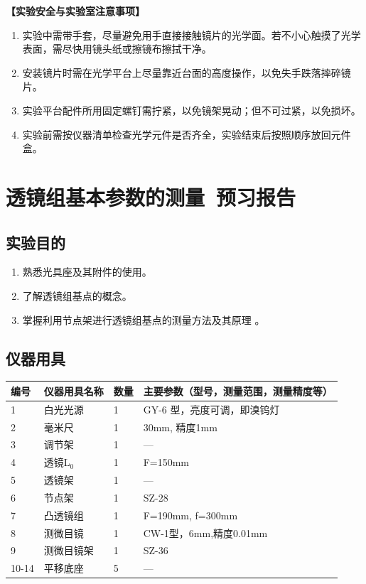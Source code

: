 \documentclass[dvipsnames, svgnames,a4paper,11pt]{article}
\begin{document}
\textbf{【实验安全与实验室注意事项】}\\
\begin{enumerate}
    \item 实验中需带手套，尽量避免用手直接接触镜片的光学面。若不小心触摸了光学表面，需尽快用镜头纸或擦镜布擦拭干净。
    \item 安装镜片时需在光学平台上尽量靠近台面的高度操作，以免失手跌落摔碎镜片。
    \item 实验平台配件所用固定螺钉需拧紧，以免镜架晃动；但不可过紧，以免损坏。
    \item 实验前需按仪器清单检查光学元件是否齐全，实验结束后按照顺序放回元件盒。
\end{enumerate}

\clearpage
\tableofcontents
\clearpage

\setcounter{section}{0}
\section{透镜组基本参数的测量\ \textbf{预习报告}}
	
\subsection{实验目的}
\begin{enumerate}
    \item 熟悉光具座及其附件的使用。
	\item 了解透镜组基点的概念。
	\item 掌握利用节点架进行透镜组基点的测量方法及其原理 。
\end{enumerate}
\subsection{仪器用具}
\begin{table}[htbp]
	\centering
	\renewcommand\arraystretch{1.6}
	\begin{tabular}{p{}|p{}|p{}|p{}}
	\hline
	编号& 仪器用具名称 & 数量 &  主要参数（型号，测量范围，测量精度等） \\
	\hline
	1&白光光源&1&GY-6 型，亮度可调，即溴钨灯\\
	\hline
	2&毫米尺&1&30mm, 精度1mm\\
	\hline
	3&调节架&1&---\\
	\hline
    4&透镜L$_0$&1&F=150mm\\
	\hline
    5&透镜架&1&---\\
	\hline
    6&节点架&1&SZ-28\\
	\hline
    7&凸透镜组&1&F=190mm, f=300mm\\
	\hline
    8&测微目镜&1&CW-1型，6mm,精度0.01mm\\
	\hline
    9&测微目镜架&1&SZ-36\\
	\hline
    10-14&平移底座&5&---\\
	\hline
\end{tabular}
\end{table}
\end{document}
